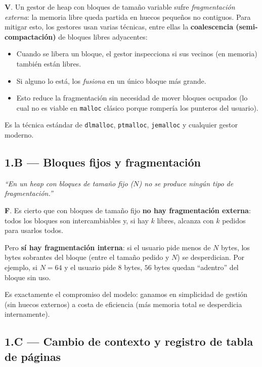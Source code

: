 \documentclass[11pt,a4paper]{article}
\begin{document}
\begin{respuesta}
\textbf{V}. Un gestor de heap con bloques de tamaño variable sufre
\emph{fragmentación externa}: la memoria libre queda partida en
huecos pequeños no contiguos. Para mitigar esto, los gestores usan
varias técnicas, entre ellas la \textbf{coalescencia (semi-compactación)}
de bloques libres adyacentes:

\begin{itemize}[leftmargin=*,nosep]
    \item Cuando se libera un bloque, el gestor inspecciona si sus
        vecinos (en memoria) también están libres.
    \item Si alguno lo está, los \emph{fusiona} en un único bloque
        más grande.
    \item Esto reduce la fragmentación sin necesidad de mover bloques
        ocupados (lo cual no es viable en \texttt{malloc} clásico
        porque rompería los punteros del usuario).
\end{itemize}

Es la técnica estándar de \texttt{dlmalloc}, \texttt{ptmalloc},
\texttt{jemalloc} y cualquier gestor moderno.
\end{respuesta}

\subsection*{1.B --- Bloques fijos y fragmentación}

\emph{``En un heap con bloques de tamaño fijo ($N$) no se produce
ningún tipo de fragmentación.''}

\begin{respuesta}
\textbf{F}. Es cierto que con bloques de tamaño fijo \textbf{no hay
fragmentación externa}: todos los bloques son intercambiables y, si
hay $k$ libres, alcanza con $k$ pedidos para usarlos todos.

Pero \textbf{sí hay fragmentación interna}: si el usuario pide menos
de $N$ bytes, los bytes sobrantes del bloque (entre el tamaño pedido
y $N$) se desperdician. Por ejemplo, si $N = 64$ y el usuario pide
$8$ bytes, $56$ bytes quedan ``adentro'' del bloque sin uso.

Es exactamente el compromiso del modelo: ganamos en simplicidad de
gestión (sin huecos externos) a costa de eficiencia (más memoria
total se desperdicia internamente).
\end{respuesta}

\subsection*{1.C --- Cambio de contexto y registro de tabla de páginas}
\end{document}

